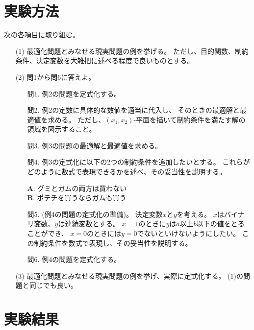 \documentclass[12pt]{jarticle}
\begin{document}
\section{実験方法}
次の各項目に取り組む。
\begin{itemize}
    \item[(1)] 最適化問題とみなせる現実問題の例を挙げる。
          ただし、目的関数、制約条件、決定変数を大雑把に述べる程度で良いものとする。
    \item[(2)]問1から問6に答えよ。
          \begin{itemize}
              \item[問1.] 例2の問題を定式化する。
              \item[問2.] 例2の定数に具体的な数値を適当に代入し、
                    そのときの最適解と最適値を求める。
                    ただし、$(x_1,x_2)$-平面を描いて制約条件を満たす解の領域を図示すること。
              \item[問3.] 例3の問題の最適解と最適値を求める。
              \item[問4.] 例3の定式化に以下の2つの制約条件を追加したいとする。
                    これらがどのように数式で表現できるかを述べ、その妥当性を説明する。
                    \begin{center}
                        \textbf{A}. グミとガムの両方は買わない\\
                        \textbf{B}. ポテチを買うならガムも買う\\
                    \end{center}
              \item[問5.] (例4の問題の定式化の準備)。
                    決定変数$x$と$y$を考える。
                    $x$はバイナリ変数、$y$は連続変数とする。
                    $x=1$のときに$y$は$a$以上$b$以下の値をとることができ、
                    $x=0$のときには$y=0$でないといけないようにしたい。
                    この制約条件を数式で表現し、その妥当性を説明する。
              \item[問6.] 例4の問題を定式化する。
          \end{itemize}

    \item[(3)]最適化問題とみなせる現実問題の例を挙げ、実際に定式化する。
          (1)の問題と同じでも良い。
\end{itemize}

\section{実験結果}
\end{document}
